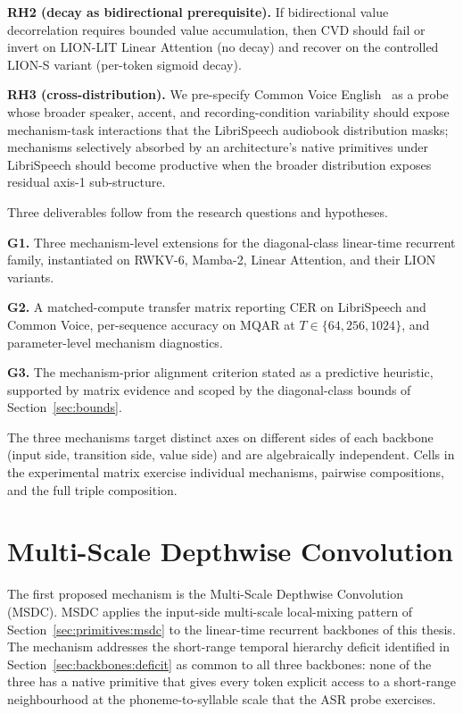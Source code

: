 \textbf{RH2 (decay as bidirectional prerequisite).} If
bidirectional value decorrelation requires bounded value
accumulation, then CVD should fail or invert on LION-LIT Linear
Attention (no decay) and recover on the controlled LION-S variant
(per-token sigmoid decay).

\textbf{RH3 (cross-distribution).} We pre-specify Common Voice
English~\cite{ardila2019commonvoice} as a probe whose broader
speaker, accent, and recording-condition variability should expose
mechanism-task interactions that the LibriSpeech audiobook
distribution masks; mechanisms selectively absorbed by an
architecture's native primitives under LibriSpeech should become
productive when the broader distribution exposes residual axis-1
sub-structure.

Three deliverables follow from the research questions and
hypotheses.

\textbf{G1.} Three mechanism-level extensions for the
diagonal-class linear-time recurrent family, instantiated on
RWKV-6, Mamba-2, Linear Attention, and their LION variants.

\textbf{G2.} A matched-compute transfer matrix reporting CER on
LibriSpeech and Common Voice, per-sequence accuracy on MQAR at
$T \in \{64, 256, 1024\}$, and parameter-level mechanism
diagnostics.

\textbf{G3.} The mechanism-prior alignment criterion stated as a
predictive heuristic, supported by matrix evidence and scoped by
the diagonal-class bounds of Section~\ref{sec:bounds}.

The three mechanisms target distinct axes on different sides of
each backbone (input side, transition side, value side) and are
algebraically independent. Cells in the experimental matrix
exercise individual mechanisms, pairwise compositions, and the
full triple composition.

\section{Multi-Scale Depthwise Convolution}\label{sec:proposed:msdc}

The first proposed mechanism is the Multi-Scale Depthwise Convolution
(MSDC). MSDC applies the input-side multi-scale local-mixing
pattern of Section~\ref{sec:primitives:msdc} to the linear-time
recurrent backbones of this thesis. The mechanism addresses the
short-range temporal hierarchy deficit identified in
Section~\ref{sec:backbones:deficit} as common to all three backbones:
none of the three has a native primitive that gives every token
explicit access to a short-range neighbourhood at the
phoneme-to-syllable scale that the ASR probe exercises.

